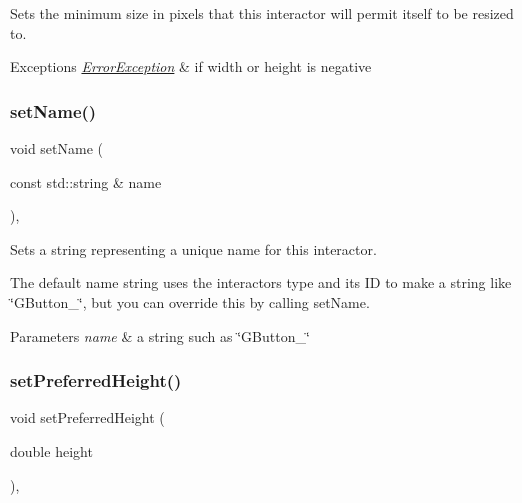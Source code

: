 Sets the minimum size in pixels that this interactor will permit itself to be resized to. 


\begin{DoxyExceptions}{Exceptions}
{\em \mbox{\hyperlink{classErrorException}{Error\+Exception}}} & if width or height is negative \\
\hline
\end{DoxyExceptions}
\mbox{\label{classGInteractor_a9d3a2685df23b5e7cbf59c19c4a1f9b5}} 
\subsubsection{\texorpdfstring{set\+Name()}{setName()}}
{\footnotesize\ttfamily void set\+Name (\begin{DoxyParamCaption}\item[{const std\+::string \&}]{name }\end{DoxyParamCaption})\hspace{0.3cm}{\ttfamily [virtual]}, {\ttfamily [inherited]}}



Sets a string representing a unique name for this interactor. 

The default name string uses the interactor\textquotesingle{}s type and its ID to make a string like \char`\"{}\+G\+Button\+\_\char`\"{}, but you can override this by calling set\+Name. 
\begin{DoxyParams}{Parameters}
{\em name} & a string such as \char`\"{}\+G\+Button\+\_\char`\"{} \\
\hline
\end{DoxyParams}
\mbox{\label{classGInteractor_a1ab987704fce32098706c6f00fb08218}} 
\subsubsection{\texorpdfstring{set\+Preferred\+Height()}{setPreferredHeight()}}
{\footnotesize\ttfamily void set\+Preferred\+Height (\begin{DoxyParamCaption}\item[{double}]{height }\end{DoxyParamCaption})\hspace{0.3cm}{\ttfamily [virtual]}, {\ttfamily [inherited]}}



